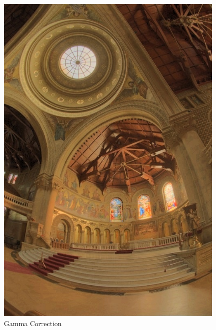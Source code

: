 \documentclass{article}
\begin{document}
\begin{figure}[!htb]
      \includegraphics[scale=.27]{./data/2/ln/s2.jpg}
      \caption{Gamma Correction}
    \endminipage\hfill

\end{figure}
\end{document}
